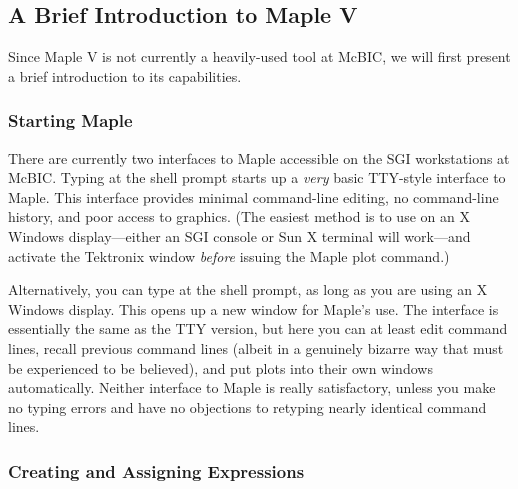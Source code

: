\subsection{A Brief Introduction to Maple V}

Since Maple V is not currently a heavily-used tool at McBIC, we will
first present a brief introduction to its capabilities.

\subsubsection{Starting Maple}

There are currently two interfaces to Maple accessible on the SGI
workstations at McBIC.  Typing  at the shell prompt starts
up a {\em very} basic TTY-style interface to Maple.  This interface
provides minimal command-line editing, no command-line history, and
poor access to graphics.  (The easiest method is to use
 on an X Windows display---either an SGI console or Sun
X terminal will work---and activate the Tektronix window {\em before}
issuing the Maple plot command.)

Alternatively, you can type  at the shell prompt, as long
as you are using an X Windows display.  This opens up a new window for
Maple's use.  The interface is essentially the same as the TTY version,
but here you can at least edit command lines, recall previous command
lines (albeit in a genuinely bizarre way that must be experienced to be
believed), and put plots into their own windows automatically.  Neither
interface to Maple is really satisfactory, unless you make no typing
errors and have no objections to retyping nearly identical command
lines.

\subsubsection{Creating and Assigning Expressions}


